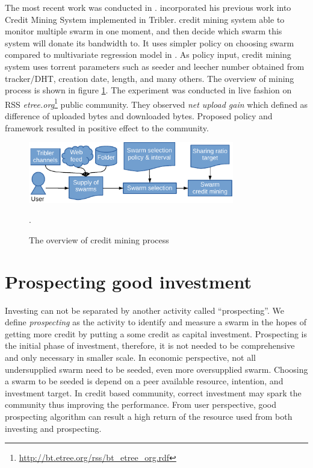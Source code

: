 The most recent work was conducted in \citeyear{2015:creditmining:capota}\cite{2015:creditmining:capota}. \citeauthor{2015:creditmining:capota} incorporated his previous work into Credit Mining System implemented in Tribler. credit mining system able to monitor multiple swarm in one moment, and then decide which swarm this system will donate its bandwidth to. It uses simpler policy on choosing swarm compared to multivariate regression model in \cite{2013:investmentcm:capota}. As policy input, credit mining system uses torrent parameters such as seeder and leecher number obtained from tracker/DHT, creation date, length, and many others. The overview of mining process is shown in figure \ref{fig:cm15}. The experiment was conducted in live fashion on RSS \textit{etree.org}\footnote{\url{http://bt.etree.org/rss/bt\_etree\_org.rdf}} public community. They observed \textit{net upload gain} which defined as difference of uploaded bytes and downloaded bytes. Proposed policy and framework resulted in positive effect to the community.

\begin{figure}[ht]
	\centering
	\includegraphics[width=0.8\textwidth]{pics/creditmining2015.pdf}
	\caption{The overview of credit mining process \cite{2015:creditmining:capota}}.
	\label{fig:cm15}
\end{figure}


\section{Prospecting good investment}

Investing can not be separated by another activity called ``prospecting''. We define \textit{prospecting} as the activity to identify and measure a swarm in the hopes of getting more credit by putting a some credit as capital investment. Prospecting is the initial phase of investment, therefore, it is not needed to be comprehensive and only necessary in smaller scale. In economic perspective, not all undersupplied swarm need to be seeded, even more oversupplied swarm. Choosing a swarm to be seeded is depend on a peer available resource, intention, and investment target. In credit based community, correct investment may spark the community thus improving the performance. From user perspective, good prospecting algorithm can result a high return of the resource used from both investing and prospecting.

